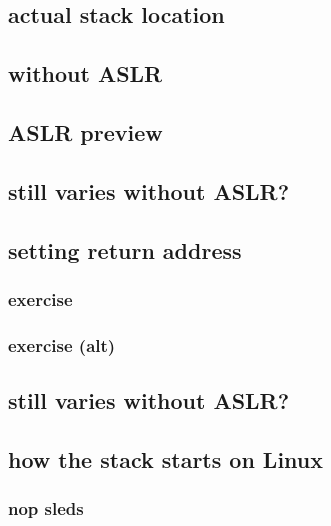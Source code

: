 \subsection{actual stack location}


\subsection{without ASLR}


\subsection{ASLR preview}


\subsection{still varies without ASLR?}



\subsection{setting return address}


\subsubsection{exercise}


\subsubsection{exercise (alt)}


\subsection{still varies without ASLR?}


\subsection{how the stack starts on Linux}


\subsubsection{nop sleds}


